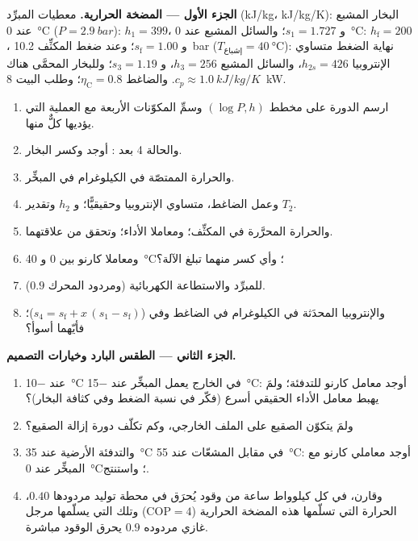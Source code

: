 \begin{problem}\label{pb:b2:open-systems:1}
\textbf{الجزء الأول --- المضخة الحرارية.}
معطيات المبرِّد (\unit{kJ/kg}، \unit{kJ/kg/K}): البخار المشبع عند
\qty{0}{\celsius} ($P = \qty{2.9}{bar}$): $h_1 = 399$، و $s_1 = 1.727$؛
والسائل المشبع عند \qty{0}{\celsius}: $h_{\text{f}} = 200$، و $s_{\text{f}} = 1.00$؛
وعند ضغط المكثِّف \qty{10.2}{bar} ($T_{\text{إشباع}} = \qty{40}{\celsius}$):
نهاية الضغط متساوي الإنتروبيا $h_{2s} = 426$، والسائل المشبع $h_3 = 256$،
و $s_3 = 1.19$؛ وللبخار المحمَّى هناك $c_p \approx \qty{1.0}{kJ/kg/K}$.
والضاغط $\eta_{\text{C}} = 0.8$؛ وطلب البيت \qty{8}{kW}.
\begin{enumerate}
  \item ارسم الدورة على مخطط $(\log P, h)$ وسمِّ المكوّنات
        الأربعة مع العملية التي يؤديها كلٌّ منها.
  \item والحالة 4 بعد : أوجد  وكسر البخار.
  \item والحرارة الممتصّة في الكيلوغرام في المبخِّر.
  \item وعمل الضاغط، متساوي الإنتروبيا وحقيقيًّا؛ و $h_2$ وتقدير
        $T_2$.
  \item والحرارة المحرَّرة في المكثِّف؛ ومعاملا الأداء؛ وتحقق من
        علاقتهما.
  \item ومعاملا كارنو بين \qty{0}{} و \qty{40}{\celsius}؛ وأي
        كسر منهما تبلغ الآلة؟
  \item {} للمبرِّد والاستطاعة الكهربائية (ومردود
        المحرك $0.9$).
  \item والإنتروبيا المحدَثة في الكيلوغرام في الضاغط وفي
         ($s_4 = s_{\text{f}} + x\,(s_1 - s_{\text{f}})$)؛ فأيّهما
        أسوأ؟
\end{enumerate}

\textbf{الجزء الثاني --- الطقس البارد وخيارات التصميم.}
\begin{enumerate}[resume]
  \item عند \qty{-10}{\celsius} في الخارج يعمل المبخِّر عند
        \qty{-15}{\celsius}: أوجد معامل كارنو للتدفئة؛ ولمَ يهبط معامل الأداء
        الحقيقي أسرع (فكّر في نسبة الضغط وفي
        كثافة البخار)؟
  \item ولمَ يتكوّن الصقيع على الملف الخارجي، وكم تكلّف
        دورة إزالة الصقيع؟
  \item والتدفئة الأرضية عند \qty{35}{\celsius} في مقابل المشعّات عند
        \qty{55}{\celsius}: أوجد معاملي كارنو مع المبخِّر عند
        \qty{0}{\celsius}؛ واستنتج.
  \item وقارن، في كل كيلوواط ساعة من وقود يُحرَق في محطة توليد
        مردودها $0.40$، الحرارة التي تسلّمها هذه المضخة الحرارية ($\mathrm{COP}
        = 4$) وتلك التي يسلّمها مرجل غازي مردوده $0.9$ يحرق الوقود
        مباشرة.
\end{enumerate}


\end{problem}

